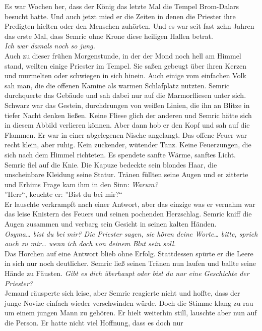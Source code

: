 Es war Wochen her, dass der König das letzte Mal die Tempel Brom-Dalars besucht hatte. Und auch 
jetzt mied er die Zeiten in denen die Priester ihre Predigten hielten oder den Menschen zuhörten. 
Und es war seit fast zehn Jahren das erste Mal, dass Semric ohne Krone diese heiligen Hallen 
betrat.\\
\textit{Ich war damals noch so jung.}\\
Auch zu dieser frühen Morgenstunde, in der der Mond noch hell am Himmel stand, weilten einige 
Priester im Tempel. Sie saßen gebeugt über ihren Kerzen und murmelten oder schwiegen in sich 
hinein. 
Auch einige vom einfachen Volk sah man, die die offenen Kamine als warmen Schlafplatz nutzten. 
Semric durchquerte das Gebäude und sah dabei nur auf die Marmorfliesen unter sich. Schwarz war das 
Gestein, durchdrungen von weißen Linien, die ihn an Blitze in tiefer Nacht denken ließen. Keine 
Fliese glich der anderen und Semric hätte sich in diesem Abbild verlieren können. Aber dann hob er 
den Kopf und sah auf die Flammen. Er war in einer abgelegenen Nische angelangt. Das offene Feuer 
war recht klein, aber ruhig. Kein zuckender, wütender Tanz. Keine Feuerzungen, die sich nach dem 
Himmel richteten. Es spendete sanfte Wärme, sanftes Licht. Semric fiel auf die Knie. Die Kapuze 
bedeckte sein blondes Haar, die unscheinbare Kleidung seine Statur. Tränen füllten seine Augen und 
er zitterte und Erhims Frage kam ihm in den Sinn: \textit{Warum?}\\
''Herr``, keuchte er: ''Bist du bei mir?``\\
Er lauschte verkrampft nach einer Antwort, aber das einzige was er vernahm war das leise Knistern 
des Feuers und seinen pochenden Herzschlag. Semric kniff die Augen zusammen und verbarg sein 
Gesicht 
in seinen kalten Händen.\\
\textit{Osyma… bist du bei mir? Die Priester sagen, sie hören deine Worte… bitte, sprich auch zu 
mir… wenn ich doch von deinem Blut sein soll.}\\
Das Horchen auf eine Antwort blieb ohne Erfolg. Stattdessen spürte er die Leere in sich nur noch 
deutlicher. Semric ließ seinen Tränen nun laufen und ballte seine Hände zu Fäusten. \textit{Gibt es 
dich überhaupt oder bist du nur eine Geschichte der Priester?}\\
Jemand räusperte sich leise, aber Semric reagierte nicht und hoffte, dass der junge Novize einfach 
wieder verschwinden würde. Doch die Stimme klang zu rau um einem jungen Mann zu gehören. Er hielt 
weiterhin still, lauschte aber nun auf die Person. Er hatte nicht viel Hoffnung, dass es doch nur 
